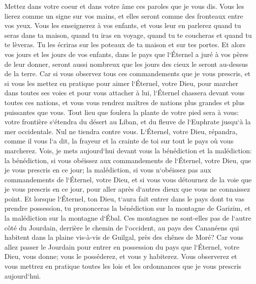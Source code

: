 \verse Mettez dans votre coeur et dans votre âme ces paroles que je vous dis. Vous les lierez comme un signe sur vos mains, et elles seront comme des fronteaux entre vos yeux. 
\verse Vous les enseignerez à vos enfants, et vous leur en parlerez quand tu seras dans ta maison, quand tu iras en voyage, quand tu te coucheras et quand tu te lèveras. 
\verse Tu les écriras sur les poteaux de ta maison et sur tes portes. 
\verse Et alors vos jours et les jours de vos enfants, dans le pays que l`Éternel a juré à vos pères de leur donner, seront aussi nombreux que les jours des cieux le seront au-dessus de la terre. 
\verse Car si vous observez tous ces commandements que je vous prescris, et si vous les mettez en pratique pour aimer l`Éternel, votre Dieu, pour marcher dans toutes ses voies et pour vous attacher à lui, 
\verse l`Éternel chassera devant vous toutes ces nations, et vous vous rendrez maîtres de nations plus grandes et plus puissantes que vous. 
\verse Tout lieu que foulera la plante de votre pied sera à vous: votre frontière s`étendra du désert au Liban, et du fleuve de l`Euphrate jusqu`à la mer occidentale. 
\verse Nul ne tiendra contre vous. L`Éternel, votre Dieu, répandra, comme il vous l`a dit, la frayeur et la crainte de toi sur tout le pays où vous marcherez. 
\verse Vois, je mets aujourd`hui devant vous la bénédiction et la malédiction: 
\verse la bénédiction, si vous obéissez aux commandements de l`Éternel, votre Dieu, que je vous prescris en ce jour; 
\verse la malédiction, si vous n`obéissez pas aux commandements de l`Éternel, votre Dieu, et si vous vous détournez de la voie que je vous prescris en ce jour, pour aller après d`autres dieux que vous ne connaissez point. 
\verse Et lorsque l`Éternel, ton Dieu, t`aura fait entrer dans le pays dont tu vas prendre possession, tu prononceras la bénédiction sur la montagne de Garizim, et la malédiction sur la montagne d`Ébal. 
\verse Ces montagnes ne sont-elles pas de l`autre côté du Jourdain, derrière le chemin de l`occident, au pays des Cananéens qui habitent dans la plaine vis-à-vis de Guilgal, près des chênes de Moré? 
\verse Car vous allez passer le Jourdain pour entrer en possession du pays que l`Éternel, votre Dieu, vous donne; vous le posséderez, et vous y habiterez. 
\verse Vous observerez et vous mettrez en pratique toutes les lois et les ordonnances que je vous prescris aujourd`hui. 

\chapter{}

